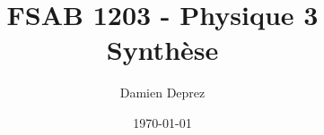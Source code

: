 \documentclass[12pt,a4paper,twoside]{report}
\begin{document}
\makeatletter

\author{Damien Deprez}
\title{FSAB 1203 - Physique 3\\Synthèse}
\date{\today}
\titre{\@title}{\@author}{\@date}{}{}

\tableofcontents
\end{document}
